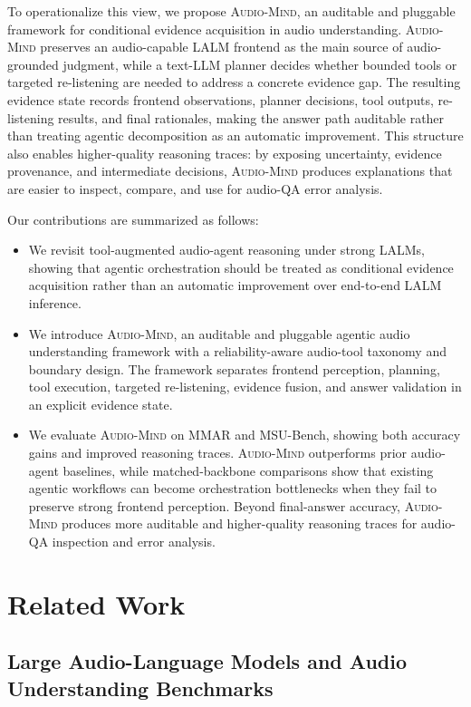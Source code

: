 \documentclass[11pt]{article}
\newcommand{\ours}{\textsc{Audio-Mind}}
\begin{document}
To operationalize this view, we propose \ours{}, an auditable and pluggable framework for conditional evidence acquisition in audio understanding. \ours{} preserves an audio-capable LALM frontend as the main source of audio-grounded judgment, while a text-LLM planner decides whether bounded tools or targeted re-listening are needed to address a concrete evidence gap. The resulting evidence state records frontend observations, planner decisions, tool outputs, re-listening results, and final rationales, making the answer path auditable rather than treating agentic decomposition as an automatic improvement. This structure also enables higher-quality reasoning traces: by exposing uncertainty, evidence provenance, and intermediate decisions, \ours{} produces explanations that are easier to inspect, compare, and use for audio-QA error analysis.

Our contributions are summarized as follows:

\begin{itemize}
    \item We revisit tool-augmented audio-agent reasoning under strong LALMs, showing that agentic orchestration should be treated as conditional evidence acquisition rather than an automatic improvement over end-to-end LALM inference.

    \item We introduce \ours{}, an auditable and pluggable agentic audio understanding framework with a reliability-aware audio-tool taxonomy and boundary design. The framework separates frontend perception, planning, tool execution, targeted re-listening, evidence fusion, and answer validation in an explicit evidence state.

    \item We evaluate \ours{} on MMAR and MSU-Bench, showing both accuracy gains and improved reasoning traces. \ours{} outperforms prior audio-agent baselines, while matched-backbone comparisons show that existing agentic workflows can become orchestration bottlenecks when they fail to preserve strong frontend perception. Beyond final-answer accuracy, \ours{} produces more auditable and higher-quality reasoning traces for audio-QA inspection and error analysis.
\end{itemize}
\section{Related Work}
\label{sec:related_work}

\subsection{Large Audio-Language Models and Audio Understanding Benchmarks}
\end{document}
